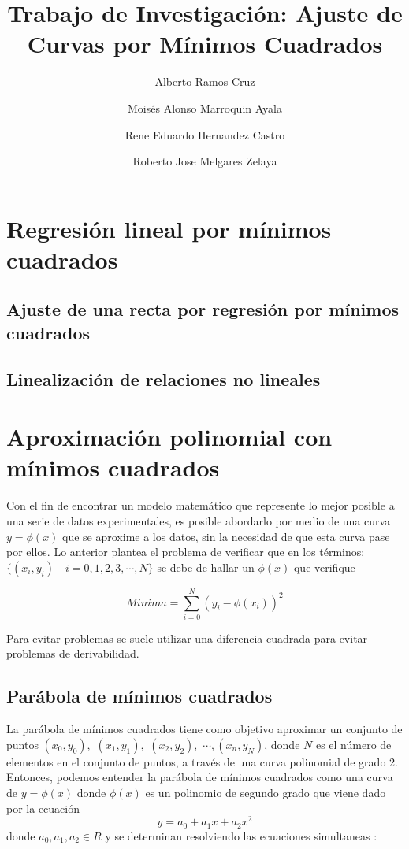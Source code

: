 \documentclass[11pt,letterpaper]{article}
\begin{document}
\title{Trabajo de Investigación: Ajuste de Curvas por Mínimos Cuadrados}

\author{
	Alberto Ramos Cruz
	\and Moisés Alonso Marroquin Ayala
	\and Rene Eduardo Hernandez Castro
	\and Roberto Jose Melgares Zelaya
}
\maketitle


\section{Regresión lineal por mínimos cuadrados}
\subsection{Ajuste de una recta por regresión por mínimos cuadrados}


\subsection{Linealización de relaciones no lineales}

\section{Aproximación polinomial con mínimos cuadrados}
Con el fin de encontrar un modelo matemático que represente lo mejor posible a una serie de datos experimentales, es posible abordarlo por medio de una curva $y=\phi(x)$ que se aproxime a los datos, sin la necesidad de que esta curva pase por ellos.
Lo anterior plantea el problema de verificar que en los términos:
$\{(x_i, y_i)\quad i = 0,1,2,3, \cdots, N\} $ se debe de hallar un $\phi(x)$ que verifique

$$Minima = \sum_{i=0}^{N} (y_i - \phi(x_i))^2$$

Para evitar problemas se suele utilizar una diferencia cuadrada para evitar problemas de derivabilidad. 
\subsection{Parábola de mínimos cuadrados}
La parábola de mínimos cuadrados tiene como objetivo aproximar un conjunto de puntos 
$(x_0, y_0),$ $(x_1, y_1),$ $ (x_2, y_2),$ $ \cdots , (x_n, y_N)$, donde $N$ es el número de elementos en el conjunto de puntos, 
a través de una curva polinomial de grado 2. Entonces, podemos entender la parábola de mínimos cuadrados como una curva de $y=\phi(x)$ donde $\phi(x)$ es un polinomio de segundo grado que viene dado por la ecuación
$$y = a_0 + a_1 x + a_2 x^2  $$
donde $a_0, a_1, a_2 \in R$ y se determinan resolviendo las ecuaciones simultaneas : 
\end{document}
